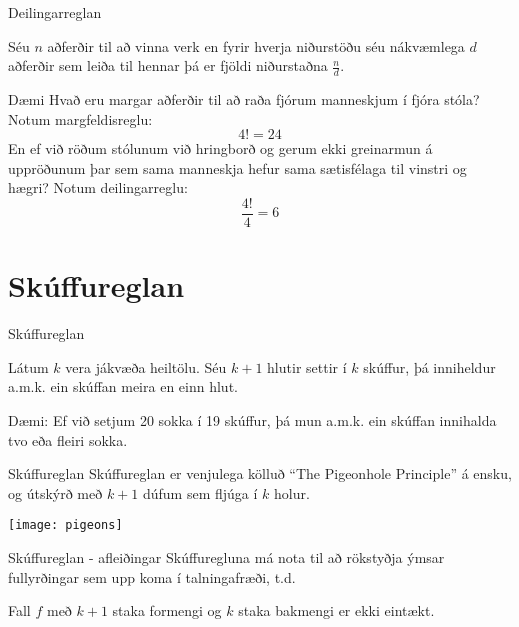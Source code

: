 \documentclass{beamer}
\begin{document}
\begin{frame}{Deilingarreglan}
\begin{tcolorbox}[title=Deilingarreglan]
Séu $n$ aðferðir til að vinna verk en fyrir hverja niðurstöðu séu nákvæmlega $d$ aðferðir sem leiða til hennar þá er fjöldi niðurstaðna $\frac{n}{d}$.
\end{tcolorbox}
\end{frame}

\begin{frame}{Dæmi}
Hvað eru margar aðferðir til að raða fjórum manneskjum í fjóra stóla? \pause Notum margfeldisreglu:
\[4! = 24\]
En ef við röðum stólunum við hringborð og gerum ekki greinarmun á uppröðunum þar sem sama manneskja hefur sama sætisfélaga til vinstri og hægri? \pause Notum deilingarreglu:
\[\frac{4!}{4} = 6\]
\end{frame}


\section{Skúffureglan}

\begin{frame}{Skúffureglan}
\begin{tcolorbox}[title=Skúffuregla Dirichlets]
Látum $k$ vera jákvæða heiltölu. Séu $k + 1$ hlutir settir í $k$ skúffur, þá inniheldur a.m.k. ein skúffan meira en einn hlut.
\end{tcolorbox}

Dæmi: Ef við setjum 20 sokka í 19 skúffur, þá mun a.m.k. ein skúffan innihalda tvo eða fleiri sokka.
\end{frame}

\begin{frame}{Skúffureglan}
Skúffureglan er venjulega kölluð ``The Pigeonhole Principle'' á ensku, og útskýrð með $k+1$ dúfum sem fljúga í $k$ holur.
\begin{center}
\texttt{[image: pigeons]}
\end{center}
\end{frame}

\begin{frame}{Skúffureglan - afleiðingar}
Skúffuregluna má nota til að rökstyðja ýmsar fullyrðingar sem upp koma í talningafræði, t.d.
\begin{tcolorbox}
Fall $f$ með $k+1$ staka formengi og $k$ staka bakmengi er ekki eintækt.
\end{tcolorbox}
\end{frame}
\end{document}
